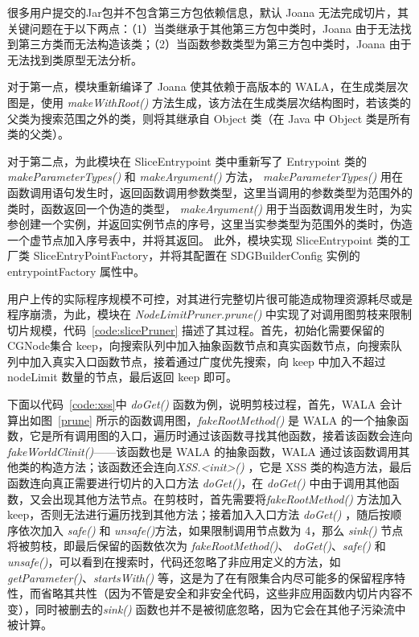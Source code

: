很多用户提交的Jar包并不包含第三方包依赖信息，默认 Joana 无法完成切片，其关键问题在于以下两点：（1）当类继承于其他第三方包中类时，Joana 由于无法找到第三方类而无法构造该类；（2）当函数参数类型为第三方包中类时，Joana 由于无法找到类原型无法分析。

对于第一点，模块重新编译了 Joana 使其依赖于高版本的 WALA，在生成类层次图是，使用 \textit{makeWithRoot()} 方法生成，该方法在生成类层次结构图时，若该类的父类为搜索范围之外的类，则将其继承自 Object 类（在 Java 中 Object 类是所有类的父类）。

对于第二点，为此模块在 SliceEntrypoint 类中重新写了 Entrypoint 类的\textit{ makeParameterTypes()} 和 \textit{makeArgument()} 方法，\textit{ makeParameterTypes()} 用在函数调用语句发生时，返回函数调用参数类型，这里当调用的参数类型为范围外的类时，函数返回一个伪造的类型，\textit{ makeArgument()} 用于当函数调用发生时，为实参创建一个实例，并返回实例节点的序号，这里当实参类型为范围外的类时，伪造一个虚节点加入序号表中，并将其返回。
此外，模块实现 SliceEntrypoint 类的工厂类 SliceEntryPointFactory，并将其配置在 SDGBuilderConfig 实例的 entrypointFactory 属性中。

\begin{minipage}[htbp]{0.9\textwidth}
    
\end{minipage}


用户上传的实际程序规模不可控，对其进行完整切片很可能造成物理资源耗尽或是程序崩溃，为此，模块在 \textit{NodeLimitPruner.prune()} 中实现了对调用图剪枝来限制切片规模，代码~\ref{code:slicePruner} 描述了其过程。首先，初始化需要保留的CGNode集合 keep，向搜索队列中加入抽象函数节点和真实函数节点，向搜索队列中加入真实入口函数节点，接着通过广度优先搜索，向 keep 中加入不超过 nodeLimit 数量的节点，最后返回 keep 即可。


下面以代码~\ref{code:xss}中 \textit{doGet()} 函数为例，说明剪枝过程，首先，WALA 会计算出如图~\ref{prune} 所示的函数调用图，\textit{fakeRootMethod()} 是 WALA 的一个抽象函数，它是所有调用图的入口，遍历时通过该函数寻找其他函数，接着该函数会连向 \textit{fakeWorldClinit()}——该函数也是 WALA 的抽象函数，WALA 通过该函数调用其他类的构造方法；该函数还会连向\textit{XSS.<init>()} ，它是 XSS 类的构造方法，最后函数连向真正需要进行切片的入口方法 \textit{doGet()}，在 \textit{doGet()} 中由于调用其他函数，又会出现其他方法节点。在剪枝时，首先需要将\textit{fakeRootMethod()} 方法加入 keep，否则无法进行遍历找到其他方法；接着加入入口方法 \textit{doGet()} ，随后按顺序依次加入 \textit{safe()} 和 \textit{unsafe()}方法，如果限制调用节点数为 4，那么 \textit{sink()} 节点将被剪枝，即最后保留的函数依次为 \textit{fakeRootMethod()}、 \textit{doGet()}、\textit{safe()} 和 \textit{unsafe()}，可以看到在搜索时，代码还忽略了非应用定义的方法，如\textit{getParameter()}、\textit{startsWith()} 等，这是为了在有限集合内尽可能多的保留程序特性，而省略其共性（因为不管是安全和非安全代码，这些非应用函数内切片内容不变），同时被删去的\textit{sink()} 函数也并不是被彻底忽略，因为它会在其他子污染流中被计算。
    
